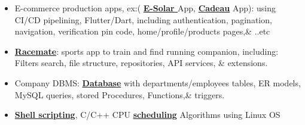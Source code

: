 



  \begin{itemize}[itemsep=0pt, parsep=0pt, topsep=0pt]
    \item{ \footnotesize E-commerce production apps, ex:( \textbf{\textcolor{cyan}{\href{https://play.google.com/store/apps/details?id=com.inova.esolar}{E-Solar }}}App, \textbf{\textcolor{cyan}{\href{https://play.google.com/store/apps/details?id=com.inova.cadeau}{Cadeau}}} App): using CI/CD pipelining, Flutter/Dart, including authentication, pagination, navigation, verification pin code, home/profile/products pages,\& ..etc}
    \item {\footnotesize \textbf{\textcolor{cyan}{\href{https://github.com/AsmaaJAH/race_app}{Racemate}}}: sports app to train and find running companion, including: Filters search, file structure, repositories, API services, \& extensions.}
   \end{itemize}



\begin{itemize}[itemsep=0pt, parsep=0pt, topsep=0pt]
  \item{ \footnotesize Company DBMS: \textbf{\textcolor{cyan}{\href{https://github.com/AsmaaJAH/database-management-system-and-SQL-language/tree/main/labs/lab\%203}{Database}}} with departments/employees tables, ER models, MySQL queries, stored Procedures, Functions,\& triggers. }
  \item {\footnotesize  \textbf{\textcolor{cyan}{\href{https://github.com/AsmaaJAH/Basic_ubuntu_shell}{Shell scripting}}},  C/C++ CPU \textbf{\textcolor{cyan}{\href{https://github.com/AsmaaJAH/FCFS-and-RR-CPU-Scheduling}{scheduling}}} Algorithms using Linux OS }
 \end{itemize}


